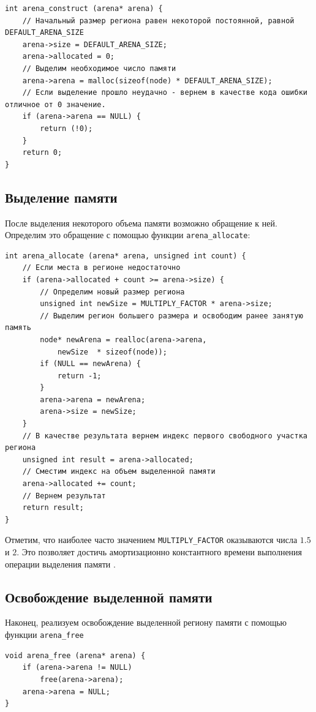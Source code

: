 \documentclass[referat]{SCWorks}
\begin{document}
\begin{verbatim}
int arena_construct (arena* arena) {
    // Начальный размер региона равен некоторой постоянной, равной DEFAULT_ARENA_SIZE
    arena->size = DEFAULT_ARENA_SIZE;
    arena->allocated = 0;
    // Выделим необходимое число памяти
    arena->arena = malloc(sizeof(node) * DEFAULT_ARENA_SIZE);
    // Если выделение прошло неудачно - вернем в качестве кода ошибки отличное от 0 значение.
    if (arena->arena == NULL) {
        return (!0);
    }
    return 0;
}
\end{verbatim}

\subsection{Выделение памяти}
После выделения некоторого объема памяти возможно обращение к ней. Определим это обращение с помощью функции \verb|arena_allocate|:

\begin{verbatim}
int arena_allocate (arena* arena, unsigned int count) {
    // Если места в регионе недостаточно
    if (arena->allocated + count >= arena->size) {
        // Определим новый размер региона
        unsigned int newSize = MULTIPLY_FACTOR * arena->size;
        // Выделим регион большего размера и освободим ранее занятую память
        node* newArena = realloc(arena->arena, 
            newSize  * sizeof(node));
        if (NULL == newArena) {
            return -1;
        }
        arena->arena = newArena;
        arena->size = newSize;
    }
    // В качестве результата вернем индекс первого свободного участка региона
    unsigned int result = arena->allocated;
    // Сместим индекс на объем выделенной памяти
    arena->allocated += count;
    // Вернем результат
    return result;
}
\end{verbatim}
Отметим, что наиболее часто значением \verb|MULTIPLY_FACTOR| оказываются числа $1.5$ и $2$. Это позволяет достичь амортизационно константного времени выполнения операции выделения памяти \cite{Facebook}.

\subsection{Освобождение выделенной памяти}
Наконец, реализуем освобождение выделенной региону памяти с помощью функции \verb|arena_free|

\begin{verbatim}
void arena_free (arena* arena) {
    if (arena->arena != NULL)
        free(arena->arena);
    arena->arena = NULL;
}
\end{verbatim}
\end{document}
